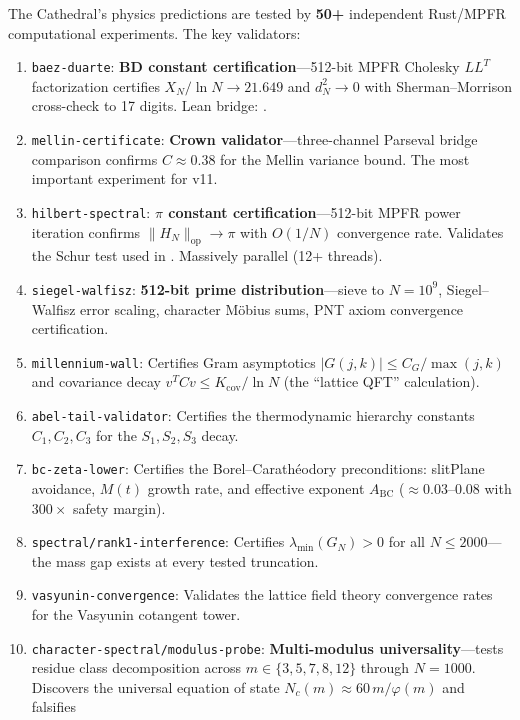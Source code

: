 The Cathedral's physics predictions are tested by \textbf{50+} independent
Rust/MPFR computational experiments. The key validators:
\begin{enumerate}
  \item \texttt{baez-duarte}: \textbf{BD constant certification}---512-bit
    MPFR Cholesky $LL^T$ factorization certifies $X_N/\ln N \to 21.649$
    and $d_N^2 \to 0$ with Sherman--Morrison cross-check to 17 digits.
    Lean bridge: .
  \item \texttt{mellin-certificate}: \textbf{Crown validator}---three-channel
    Parseval bridge comparison confirms $C \approx 0.38$ for the Mellin
    variance bound. The most important experiment for v11.
  \item \texttt{hilbert-spectral}: \textbf{$\pi$ constant certification}---512-bit
    MPFR power iteration confirms $\|H_N\|_{\mathrm{op}} \to \pi$ with
    $O(1/N)$ convergence rate. Validates the Schur test used in
    . Massively parallel (12+ threads).
  \item \texttt{siegel-walfisz}: \textbf{512-bit prime distribution}---sieve
    to $N = 10^9$, Siegel--Walfisz error scaling, character M\"obius sums,
    PNT axiom convergence certification.
  \item \texttt{millennium-wall}: Certifies Gram asymptotics
    $|G(j,k)| \leq C_G/\max(j,k)$ and covariance decay
    $v^T C v \leq K_{\mathrm{cov}}/\ln N$ (the ``lattice QFT'' calculation).
  \item \texttt{abel-tail-validator}: Certifies the thermodynamic
    hierarchy constants $C_1, C_2, C_3$ for the $S_1, S_2, S_3$ decay.
  \item \texttt{bc-zeta-lower}: Certifies the Borel--Carath\'eodory
    preconditions: slitPlane avoidance, $M(t)$ growth rate, and
    effective exponent $A_{\mathrm{BC}}$ ($\approx 0.03$--$0.08$ with
    $300\times$ safety margin).
  \item \texttt{spectral/rank1-interference}: Certifies
    $\lambda_{\min}(G_N) > 0$ for all $N \leq 2000$---the mass gap
    exists at every tested truncation.
  \item \texttt{vasyunin-convergence}: Validates the lattice field theory
    convergence rates for the Vasyunin cotangent tower.
  \item \texttt{character-spectral/modulus-probe}: \textbf{Multi-modulus
    universality}---tests residue class decomposition across
    $m \in \{3,5,7,8,12\}$ through $N = 1000$. Discovers the universal
    equation of state $N_c(m) \approx 60\,m/\varphi(m)$ and falsifies

\end{enumerate}
